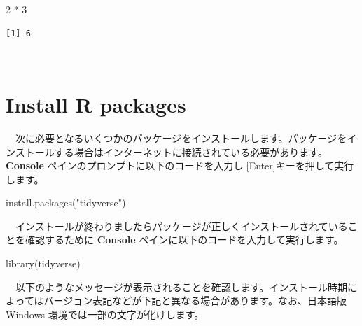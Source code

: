 \documentclass[
  12pt,
]{book}
\newenvironment{Shaded}{\begin{snugshade}}{\end{snugshade}}
\newcommand{\DecValTok}[1]{\textcolor[rgb]{0.00,0.00,0.81}{#1}}
\newcommand{\FunctionTok}[1]{\textcolor[rgb]{0.00,0.00,0.00}{#1}}
\newcommand{\NormalTok}[1]{#1}
\newcommand{\SpecialCharTok}[1]{\textcolor[rgb]{0.00,0.00,0.00}{#1}}
\newcommand{\StringTok}[1]{\textcolor[rgb]{0.31,0.60,0.02}{#1}}
\begin{document}
\begin{Shaded}
\begin{Highlighting}[numbers=left,,]
\DecValTok{2} \SpecialCharTok{*} \DecValTok{3}
\end{Highlighting}
\end{Shaded}

\begin{verbatim}
[1] 6
\end{verbatim}

　

\hypertarget{install-r-packages}{%
\section{Install R packages}\label{install-r-packages}}

　次に必要となるいくつかのパッケージをインストールします。パッケージをインストールする場合はインターネットに接続されている必要があります。 \textbf{Console} ペインのプロンプトに以下のコードを入力し {[}Enter{]}キーを押して実行します。

\begin{Shaded}
\begin{Highlighting}[numbers=left,,]
\FunctionTok{install.packages}\NormalTok{(}\StringTok{"tidyverse"}\NormalTok{)}
\end{Highlighting}
\end{Shaded}

　インストールが終わりましたらパッケージが正しくインストールされていることを確認するために \textbf{Console} ペインに以下のコードを入力して実行します。

\begin{Shaded}
\begin{Highlighting}[numbers=left,,]
\FunctionTok{library}\NormalTok{(tidyverse)}
\end{Highlighting}
\end{Shaded}

　以下のようなメッセージが表示されることを確認します。インストール時期によってはバージョン表記などが下記と異なる場合があります。なお、日本語版 Windows 環境では一部の文字が化けします。
\end{document}
